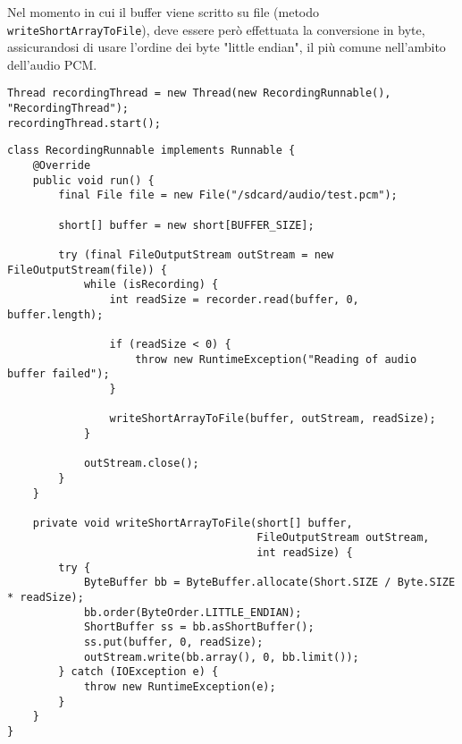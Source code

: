 Nel momento in cui il buffer viene scritto su file (metodo \texttt{writeShortArrayToFile}), deve essere però effettuata la conversione in byte, assicurandosi di usare l'ordine dei byte "little endian", il più comune nell'ambito dell'audio PCM.

\begin{verbatim}
Thread recordingThread = new Thread(new RecordingRunnable(), "RecordingThread");
recordingThread.start();
\end{verbatim}

\begin{verbatim}
class RecordingRunnable implements Runnable {
    @Override
    public void run() {
        final File file = new File("/sdcard/audio/test.pcm");

        short[] buffer = new short[BUFFER_SIZE];

        try (final FileOutputStream outStream = new FileOutputStream(file)) {
            while (isRecording) {
                int readSize = recorder.read(buffer, 0, buffer.length);

                if (readSize < 0) {
                    throw new RuntimeException("Reading of audio buffer failed");
                }

                writeShortArrayToFile(buffer, outStream, readSize);
            }

            outStream.close();
        }
    }
    
    private void writeShortArrayToFile(short[] buffer,
                                       FileOutputStream outStream,
                                       int readSize) {
        try {
            ByteBuffer bb = ByteBuffer.allocate(Short.SIZE / Byte.SIZE * readSize);
            bb.order(ByteOrder.LITTLE_ENDIAN);
            ShortBuffer ss = bb.asShortBuffer();
            ss.put(buffer, 0, readSize);
            outStream.write(bb.array(), 0, bb.limit());
        } catch (IOException e) {
            throw new RuntimeException(e);
        }
    }
}
\end{verbatim}

